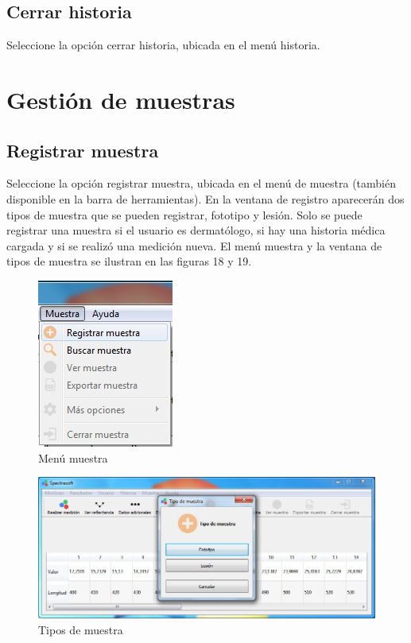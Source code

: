 	\subsection{Cerrar historia}
	
	Seleccione la opci\'{o}n cerrar historia, ubicada en el men\'{u} historia.

\newpage

\section{Gesti\'{o}n de muestras}

	\subsection{Registrar muestra}
	
	Seleccione la opci\'{o}n registrar muestra, ubicada en el men\'{u} de muestra (tambi\'{e}n disponible en la barra de herramientas). En la ventana de registro aparecer\'{a}n dos tipos de muestra que se pueden registrar, fototipo y lesi\'{o}n. Solo se puede registrar una muestra si el usuario es dermat\'{o}logo, si hay una historia m\'{e}dica cargada y si se realiz\'{o} una medici\'{o}n nueva. El men\'{u} muestra y la ventana de tipos de muestra se ilustran en las figuras 18 y 19.
	
\begin{figure}[H]
  \centering
  \includegraphics[width=.3\linewidth]{./img/menu-muestra.jpg}
\caption{Men\'{u} muestra}
\end{figure}

\begin{figure}[H]
  \centering
  \includegraphics[width=.9\linewidth]{./img/tipo-muestra.jpg}
\caption{Tipos de muestra}
\end{figure}
	
